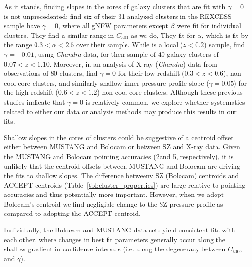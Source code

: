 \documentclass[iop,numberedappendix,apj]{emulateapj}
\begin{document}

As it stands, finding slopes in the cores of galaxy clusters that are fit with $\gamma = 0$ is not unprecedented; 
 find six of their 31 analyzed clusters in the REXCESS sample have $\gamma=0$, where all gNFW parameters 
except $\beta$ were fit for individual clusters. They find a similar range in $C_{500}$ as we do, They fit for $\alpha$, 
which is fit by the range $0.3 < \alpha < 2.5$ over their sample. While  is a local ($z < 0.2$) sample,
\citet{mantz2016} find $\gamma=-0.01$, using \emph{Chandra} data, for their sample of 40 galaxy clusters of $0.07 < z < 1.10$.
Moreover, in an analysis of X-ray (\emph{Chandra}) data from observations of 80 clusters, 
\citet{mcdonald2014} find $\gamma=0$ for their low redshift ($0.3 < z < 0.6$), non-cool-core clusters, and similarly shallow 
inner pressure profile slope ($\gamma=0.05$) for the high redshift ($0.6 < z < 1.2$) non-cool-core clusters.
Although these previous studies indicate that $\gamma = 0$ is relatively common, we explore whether systematics related to
either our data or analysis methods may produce this results in our fits.

Shallow slopes in the cores of clusters could be suggestive of a centroid offset either between MUSTANG and Bolocam or
between SZ and X-ray data. Given the MUSTANG and Bolocam pointing accuracies (2\asec and 5\asec, respectively),
it is unlikely that the centroid offsets between MUSTANG and Bolocam are driving the fits to shallow slopes. 
The difference betweenv SZ (Bolocam) centroids and ACCEPT centroids (Table~\ref{tbl:cluster_properties}) 
are large relative to pointing accuracies and thus potentially more important. However, when we adopt Bolocam's centroid 
we find negligible change to the SZ pressure profile as compared to adopting the ACCEPT centroid. 

Individually, the Bolocam and MUSTANG data sets yield consistent fits with each other, where changes in best fit 
parameters generally occur along the shallow gradient in confidence intervals (i.e. along the degeneracy
between  $C_{500}$, and $\gamma$).
\end{document}
